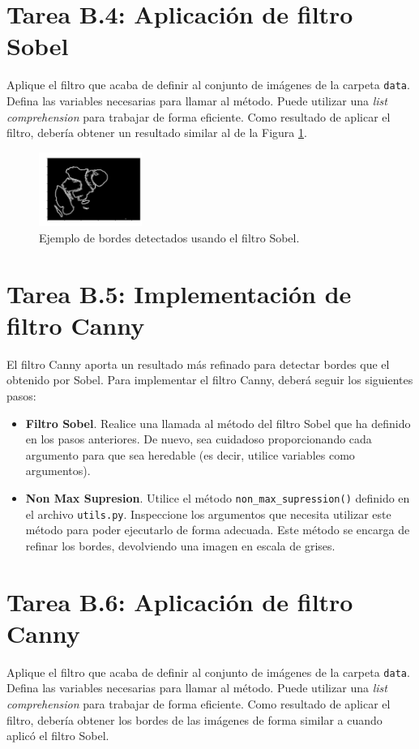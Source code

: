 \section*{Tarea B.4: Aplicación de filtro Sobel}
{}

Aplique el filtro que acaba de definir al conjunto de imágenes de la carpeta \texttt{data}. Defina las variables necesarias para llamar al método. Puede utilizar una \textit{list comprehension} para trabajar de forma eficiente. Como resultado de aplicar el filtro, debería obtener un resultado similar al de la Figura \ref{fig:edges}.

\begin{figure}[H]
    \centering
    \includegraphics[width=0.3\textwidth]{Lab_2/template/figures/edges.png}
    \caption{Ejemplo de bordes detectados usando el filtro Sobel.}
    \label{fig:edges}
\end{figure}

\section*{Tarea B.5: Implementación de filtro Canny}
{}
El filtro Canny aporta un resultado más refinado para detectar bordes que el obtenido por Sobel. Para implementar el filtro Canny, deberá seguir los siguientes pasos:

\begin{itemize}
    \item \textbf{Filtro Sobel}. Realice una llamada al método del filtro Sobel que ha definido en los pasos anteriores. De nuevo,  sea cuidadoso proporcionando cada argumento para que sea heredable (es decir, utilice variables como argumentos).
    \item \textbf{Non Max Supresion}. Utilice el método \texttt{non\_max\_supression()} definido en el archivo \texttt{utils.py}. Inspeccione los argumentos que necesita utilizar este método para poder ejecutarlo de forma adecuada. Este método se encarga de refinar los bordes, devolviendo una imagen en escala de grises. 
\end{itemize}

\section*{Tarea B.6: Aplicación de filtro Canny}
{}

Aplique el filtro que acaba de definir al conjunto de imágenes de la carpeta \texttt{data}. Defina las variables necesarias para llamar al método. Puede utilizar una \textit{list comprehension} para trabajar de forma eficiente. Como resultado de aplicar el filtro, debería obtener los bordes de las imágenes de forma similar a cuando aplicó el filtro Sobel.